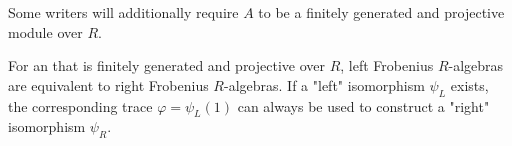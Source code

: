 \begin{definition}
\begin{itemize}

    \end{itemize}

    Some writers will additionally require $A$ to be a finitely generated and projective module over $R$.

    For an  that is finitely generated and projective over $R$, left Frobenius $R$-algebras are equivalent to right Frobenius $R$-algebras. If a "left" isomorphism $\psi_L$ exists, the corresponding trace $\varphi = \psi_L(1)$ can always be used to construct a "right" isomorphism $\psi_R$. 


\end{definition}
